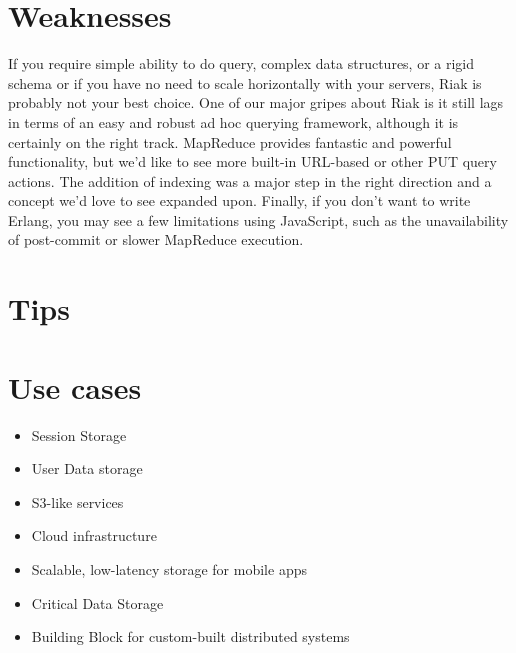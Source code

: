 \section{Weaknesses}

If you require simple ability to do query, complex data structures, or a rigid schema or if you have no need to scale horizontally with your servers, Riak is probably not your best choice. One of our major gripes about Riak is it still lags in terms of an easy and robust ad hoc querying framework, although it is certainly on the right track. MapReduce provides fantastic and powerful functionality, but we’d like to see more built-in URL-based or other PUT query actions. The addition of indexing was a major step in the right direction and a concept we’d love to see expanded upon. Finally, if you don’t want to write Erlang, you may see a few limitations using JavaScript, such as the unavailability of post-commit or slower MapReduce execution.\cite{seven_databases}

\section{Tips}

\section{Use cases}

\begin{itemize}
  \item Session Storage
  \item User Data storage
  \item S3-like services
  \item Cloud infrastructure
  \item Scalable, low-latency storage for mobile apps
  \item Critical Data Storage
  \item Building Block for custom-built distributed systems
\end{itemize}